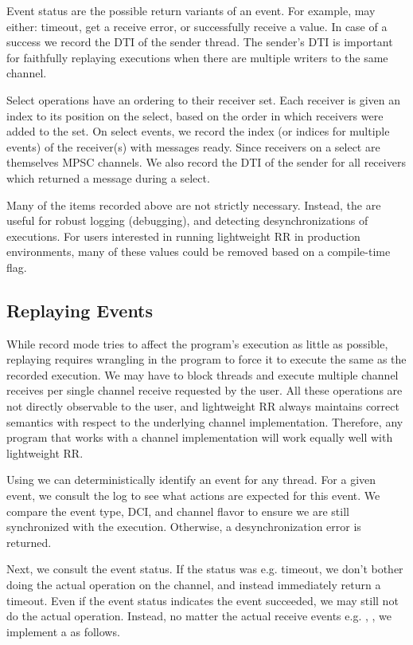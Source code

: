 Event status are the possible return variants of an event. For example, 
may either: timeout, get a receive error, or successfully receive a value. In case of a
success we record the DTI of the sender thread. The sender's DTI is
important for faithfully replaying executions when there are multiple writers
to the same channel.

Select operations have an ordering to their receiver set. Each receiver is given
an index to its position on the select, based on the order in which receivers were added to
the set. On select events, we record the index (or indices for multiple events) of the
receiver(s) with messages ready. Since receivers on a select are themselves MPSC channels. We
also record the DTI of the sender for all receivers which returned a message during a select.

Many of the items recorded above are not strictly necessary. Instead, the are useful for
robust logging (debugging), and detecting desynchronizations of executions. For users
interested in running lightweight RR in production environments, many of these values could
be removed based on a compile-time flag.

\subsection{Replaying Events}
While record mode tries to affect the program's execution as little as possible,
replaying requires wrangling in the program to force it to execute the same as the recorded
execution. We may have to block threads and execute multiple channel receives
per single channel receive requested by the user. All these operations are not directly
observable to the user, and lightweight RR always maintains correct semantics with respect
to the underlying channel implementation. Therefore, any program that works with a channel
implementation will work equally well with lightweight RR.

Using  we can deterministically identify an event for any thread.
For a given event, we consult the log to see what actions are expected for this event.
We compare the event type, DCI, and channel flavor to ensure we are still
synchronized with the execution. Otherwise, a desynchronization error is returned.

Next, we consult the event status. If the status was e.g. timeout, we don't bother
doing the actual operation on the channel, and instead immediately return a timeout.
Even if the event status indicates the event succeeded, we may still not
do the actual operation. Instead, no matter the actual receive events e.g.
, ,
we implement a  as follows.

